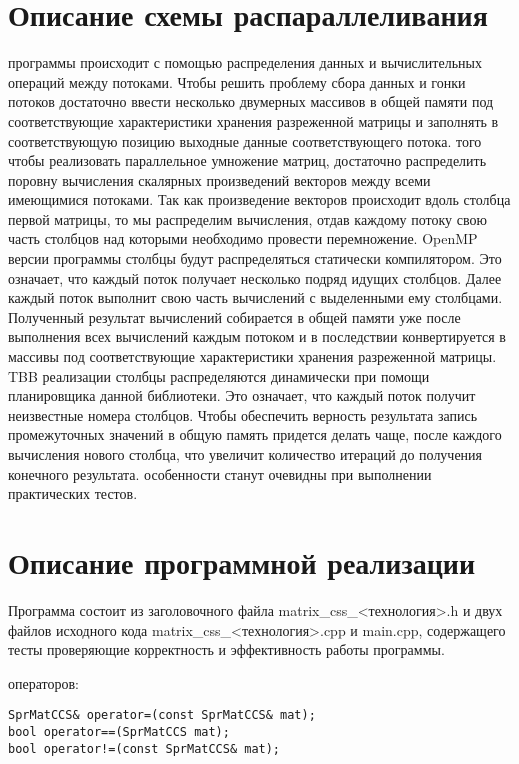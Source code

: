 \documentclass{report}
\begin{document}
\section*{Описание схемы распараллеливания}
 программы происходит с помощью распределения данных и вычислительных операций между потоками. Чтобы решить проблему сбора данных и гонки потоков достаточно ввести несколько двумерных массивов в общей памяти под соответствующие характеристики хранения разреженной матрицы и заполнять в соответствующую позицию выходные данные соответствующего потока.
 того чтобы реализовать параллельное умножение матриц, достаточно распределить поровну вычисления скалярных произведений векторов между всеми имеющимися потоками. Так как произведение векторов происходит вдоль столбца первой матрицы, то мы распределим вычисления, отдав каждому потоку свою часть столбцов над которыми необходимо провести перемножение.
 OpenMP версии программы столбцы будут распределяться статически компилятором. Это означает, что каждый поток получает несколько подряд идущих столбцов. Далее каждый поток выполнит свою часть вычислений с выделенными ему столбцами. Полученный результат вычислений собирается в общей памяти уже после выполнения всех вычислений каждым потоком и в последствии конвертируется в массивы под соответствующие характеристики хранения разреженной матрицы.
 TBB реализации столбцы распределяются динамически при помощи планировщика данной библиотеки. Это означает, что каждый поток получит неизвестные номера столбцов. Чтобы обеспечить верность результата запись промежуточных значений в общую память придется делать чаще, после каждого вычисления нового столбца, что увеличит количество итераций до получения конечного результата.
 особенности станут очевидны при выполнении практических тестов.
\newpage

\section*{Описание программной реализации}
Программа состоит из заголовочного файла matrix\_css\_<технология>.h и двух файлов исходного кода matrix\_css\_<технология>.cpp и main.cpp, содержащего тесты проверяющие корректность и эффективность работы программы.

 операторов:
\begin{lstlisting}
SprMatCCS& operator=(const SprMatCCS& mat);
bool operator==(SprMatCCS mat);
bool operator!=(const SprMatCCS& mat);
\end{lstlisting}
\end{document}

